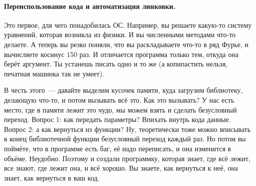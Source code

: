\documentclass{article}
\begin{document}
    \paragraph{Переиспользование кода и автоматизация линковки.}
    Это первое, для чего понадобилась ОС. Например, вы решаете какую-то систему уравнений, которая возникла из физики. И вы численными методами что-то делаете. А теперь вы резко поняли, что вы раскладываете что-то в ряд Фурье, и вычисляете косинус 150 раз. И отличается программа только тем, откуда она берёт аргумент. Ты устанешь писать одно и то же (а копипастить нельзя, печатная машинка так не умеет).
    
    В честь этого~--- давайте выделим кусочек памяти, куда загрузим библиотеку, делающую что-то, и потом вызывать всё это. Как это вызывать? У нас есть место, где в памяти лежит это чудо, мы можем взять и сделать безусловный переход. Вопрос 1: как передать параметры? Впихать внутрь кода данные. Вопрос 2: а как вернуться из функции? Ну, теоретически тоже можно вписывать в конец библиотечной функции безусловный переход каждый раз. Но потом вы поймёте, что в программе есть баг, её надо переписать, и она изменится в объёме. Неудобно. Поэтому и создали программку, которая знает, где всё лежит, все знают, где лежит она, и всё хорошо. Вы знаете, как вернуться к неё, она знает, как вернуться в ваш код.
    \begin{figure}[H]
    \end{figure}
\end{document}
